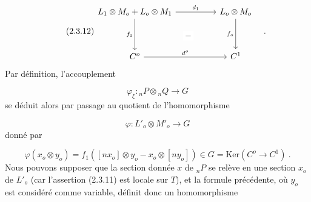 \begin{equation}\tag{2.3.12}
\begin{tikzcd}[column sep=huge, row sep=huge]
L_1\otimes M_o + L_o\otimes M_1 \arrow[r, "d_1"] \arrow[d, "f_1"'] \arrow[rd, phantom, "{-}" description] & L_o\otimes M_o \arrow[d, "f_o"'] \\
C^o \arrow[r, "d^o"] & C^1
\end{tikzcd}\quad .
\end{equation}
Par définition, l'accouplement

\begin{equation*}
\varphi_{\xi} : {}_nP \otimes {}_nQ \longrightarrow G
\end{equation*}
se déduit alors par passage au quotient de l'homomorphisme

\begin{equation*}
\varphi : L'_o \otimes M'_o \longrightarrow G
\end{equation*}
donné par

\begin{equation}\tag{2.3.13}
\varphi(x_o \otimes y_o) = f_1([nx_o] \otimes y_o - x_o \otimes [ny_o]) \in G = \mathrm{Ker}(C^o \longrightarrow C^1) \ .
\end{equation}
Nous pouvons supposer que la section donnée $x$ de ${}_nP$ se relève en une section $x_o$ de $L'_o$ (car l'assertion (2.3.11) est locale sur $T$), et la formule précédente, où $y_o$ est considéré comme variable, définit donc un homomorphisme

